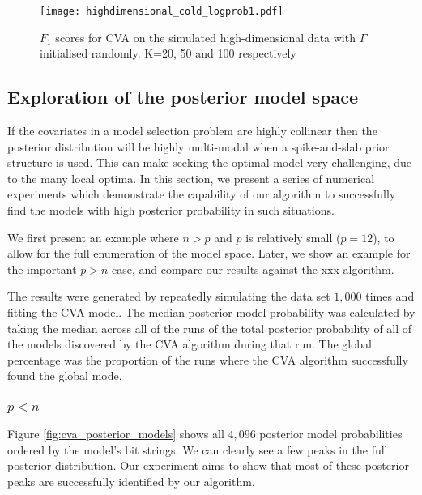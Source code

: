 \documentclass{amsart}[12pt]
\begin{document}
\begin{figure}\label{fig:highdim_cold_start}
\caption{$F_1$ scores for CVA on the simulated high-dimensional data with $\Gamma$ initialised randomly.
					K=20, 50 and 100 respectively}
\texttt{[image: highdimensional\_cold\_logprob1.pdf]}
\end{figure}

\subsection{Exploration of the posterior model space}

If the covariates in a model selection problem are highly collinear then the posterior distribution will be
highly multi-modal when a spike-and-slab prior structure is used. This can make seeking the optimal model very
challenging, due to the many local optima. In this section, we present a series of numerical experiments which
demonstrate the capability of our algorithm to successfully find the models with high posterior probability in
such situations.

We first present an example where $n > p$ and $p$ is relatively small ($p = 12$), to allow for the full 
enumeration of the model space. Later, we show an example for the important $p > n$ case, and compare our results 
against the xxx algorithm.

The results were generated by repeatedly simulating the data set $1,000$ times and fitting the CVA model.
The median posterior model probability was calculated by taking the median across all of the runs of the
total posterior probability of all of the models discovered by the CVA algorithm during that run. The global
percentage was the proportion of the runs where the CVA algorithm successfully found the global mode.

\subsubsection{$p < n$}
Figure \ref{fig:cva_posterior_models} shows all $4,096$ posterior model probabilities ordered by the model's bit
strings. We can clearly see a few peaks in the full posterior distribution. Our experiment aims to show that
most of these posterior peaks are successfully identified by our algorithm.
\end{document}
